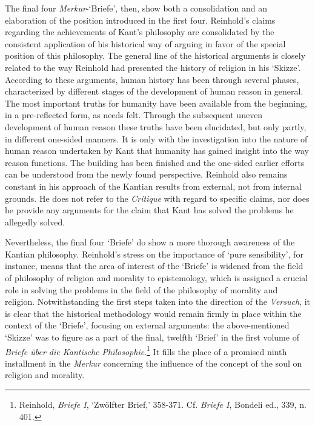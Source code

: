The final four \textit{Merkur}{-}`Briefe', then, show both a consolidation and an elaboration of the position introduced in the first four. Reinhold's claims regarding the achievements of Kant's philosophy are consolidated by the consistent application of his historical way of arguing in favor of the special position of this philosophy. The general line of the historical arguments is closely related to the way Reinhold had presented the history of religion in his `Skizze'. According to these arguments, human history has been through several phases, characterized by different stages of the development of human reason in general. The most important truths for humanity have been available from the beginning, in a pre{-}reflected form, as needs felt. Through the subsequent uneven development of human reason these truths have been elucidated, but only partly, in different one{-}sided manners. It is only with the investigation into the nature of human reason undertaken by Kant that humanity has gained insight into the way reason functions. The building has been finished and the one{-}sided earlier efforts can be understood from the newly found perspective. Reinhold also remains constant in his approach of the Kantian results from external, not from internal grounds. He does not refer to the \textit{Critique }with regard to specific claims, nor does he provide any arguments for the claim that Kant has solved the problems he allegedly solved. 

 Nevertheless, the final four `Briefe' do show a more thorough awareness of the Kantian philosophy. Reinhold's stress on the importance of `pure sensibility', for instance, means that the area of interest of the `Briefe' is widened from the field of philosophy of religion and morality to epistemology, which is assigned a crucial role in solving the problems in the field of the philosophy of morality and religion. Notwithstanding the first steps taken into the direction of the \textit{Versuch}, it is clear that the historical methodology would remain firmly in place within the context of the `Briefe', focusing on external arguments: the above{-}mentioned `Skizze' was to figure as a part of the final, twelfth `Brief' in the first volume of \-\textit{Briefe \"{u}ber die Kantische Philosophie}.\footnote{ Reinhold, \textit{Briefe I}, `Zw\"{o}lfter Brief,' 358{-}371. Cf. \textit{Briefe I}, Bondeli ed., 339, n. 401.} It fills the place of a promised ninth installment in the \textit{Merkur} concerning the influence of the concept of the soul on religion and morality. 


